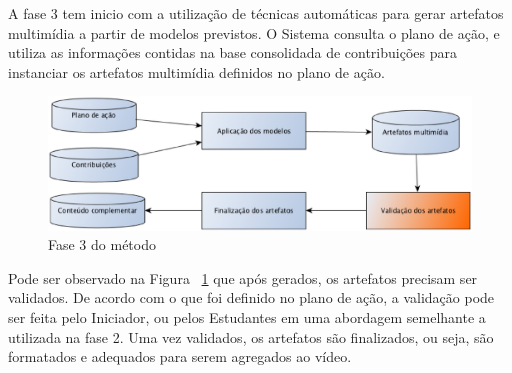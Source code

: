 A fase 3 tem inicio com a utilização de técnicas automáticas para gerar artefatos multimídia a partir de modelos previstos. O Sistema consulta o plano de ação, e utiliza as informações contidas na base consolidada de contribuições para instanciar os artefatos multimídia definidos no plano de ação.  

\begin{figure}[ht]
\centering
\includegraphics[width=.99\textwidth]{imagens/metodo/fase3_oa.eps}
\caption{Fase 3 do método}
\label{fig:metodo:fase3}
\end{figure}

Pode ser observado na Figura ~\ref{fig:metodo:fase3} que após gerados, os artefatos precisam ser validados. De acordo com o que foi definido no plano de ação, a validação pode ser feita pelo Iniciador, ou pelos Estudantes em uma abordagem semelhante a utilizada na fase 2. Uma vez validados, os artefatos são finalizados, ou seja, são formatados e adequados para serem agregados ao vídeo.

